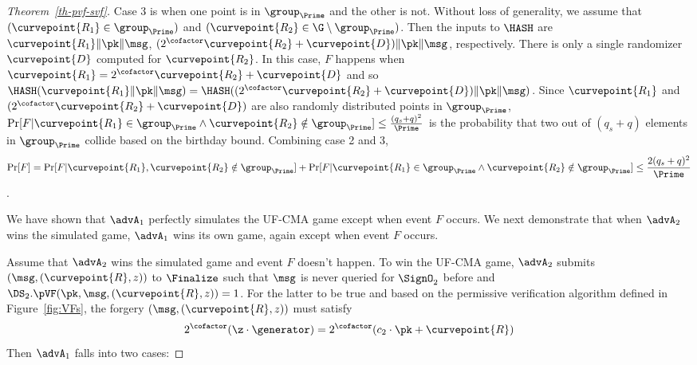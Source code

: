 \begin{proof}[Theorem~\ref{th-pvf-svf}]
	Case 3 is when one point is in $\group_{\Prime}$ and the other is not. Without loss of generality, we assume that $(\curvepoint{R_1} \in \group_{\Prime})$ and $(\curvepoint{R_2} \in \G \setminus \group_{\Prime})$. Then the inputs to $\HASH$ are $\curvepoint{R_1}\|\pk\|\msg$, 
	$(2^\cofactor\curvepoint{R_2} + \curvepoint{D})\|\pk\|\msg$, respectively.
	There is only a single randomizer $\curvepoint{D}$ computed for $\curvepoint{R_2}$. In this case, $F$ happens when $\curvepoint{R_1} = 2^\cofactor \curvepoint{R_2} + \curvepoint{D}$ and so $\HASH(\curvepoint{R_1}\|\pk\| \msg) =  \HASH((2^\cofactor\curvepoint{R_2} + \curvepoint{D}) \|\pk\| \msg)$. Since $\curvepoint{R_1}$ and $(2^\cofactor\curvepoint{R_2} + \curvepoint{D})$ are also randomly distributed points in $\group_{\Prime}$, $\Pr[F | \curvepoint{R_1} \in \group_{\Prime} \wedge \curvepoint{R_2} \notin \group_{\Prime}] \leq \frac{(q_s + q)^2}{\Prime}$ is the probability that two out of $(q_s + q)$ elements in $\group_{\Prime}$ collide based on the birthday bound. Combining case 2 and 3, 
	\[\Pr[F] = \Pr[F | \curvepoint{R_1}, \curvepoint{R_2} \notin \group_{\Prime}] + \Pr[F | \curvepoint{R_1} \in \group_{\Prime} \wedge \curvepoint{R_2} \notin \group_{\Prime}] \leq \frac{2(q_s + q)^2}{\Prime}\].
	
	We have shown that $\advA_1$ perfectly simulates the UF-CMA game except when event $F$ occurs. We next demonstrate that when $\advA_2$ wins the simulated game, $\advA_1$ wins its own game, again except when event $F$ occurs. 
	
	Assume that $\advA_2$ wins the simulated game and event $F$ doesn't happen. To win the UF-CMA game, $\advA_2$ submits $(\msg, (\curvepoint{R}, z))$ to $\Finalize$ such that $\msg$ is never queried for $\SignO_2$ before and $\DS_2.\pVF(\pk, \msg, (\curvepoint{R}, z)) = 1$. For the latter to be true and based on the permissive verification algorithm defined in Figure~\ref{fig:VFs}, the forgery $(\msg, (\curvepoint{R}, z))$ must satisfy 
	\begin{equation}
		2^\cofactor(\z \cdot  \generator) = 2^\cofactor (c_2 \cdot \pk + \curvepoint{R}) \label{eq:5}
	\end{equation}
	Then $\advA_1$ falls into two cases:
	

\end{proof}
